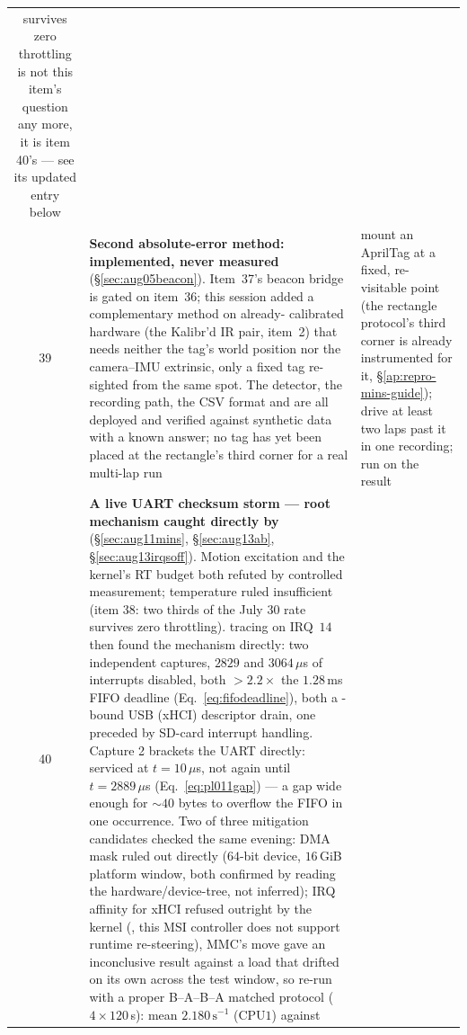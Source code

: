 \begin{longtable}{@{}cL{6.2cm}L{6.8cm}@{}}
    survives zero throttling is not this item's question any more, it is
    item 40's --- see its updated entry below \\
39 & \textbf{Second absolute-error method: implemented, never measured}
    (\S\ref{sec:aug05beacon}). Item~37's beacon bridge is gated on
    item~36; this session added a complementary method on already-
    calibrated hardware (the Kalibr'd IR pair, item~2) that needs
    neither the tag's world position nor the camera--IMU extrinsic, only
    a fixed tag re-sighted from the same spot. The detector, the
    recording path, the CSV format and  are
    all deployed and verified against synthetic data with a known
    answer; no tag has yet been placed at the rectangle's third corner
    for a real multi-lap run &
    mount an AprilTag at a fixed, re-visitable point (the rectangle
    protocol's third corner is already instrumented for it,
    \S\ref{ap:repro-mins-guide}); drive at least two laps past it in one
    recording; run  on the result \\
40 & \textbf{A live UART checksum storm --- root mechanism caught directly
    by } (\S\ref{sec:aug11mins}, \S\ref{sec:aug13ab},
    \S\ref{sec:aug13irqsoff}). Motion excitation and the kernel's RT budget
    both refuted by controlled measurement; temperature ruled insufficient
    (item 38: two thirds of the July 30 rate survives zero throttling).
     tracing on IRQ~$14$ then found the mechanism directly:
    two independent captures, $2829$ and $3064\,\mu$s of interrupts
    disabled, both $>\!2.2\times$ the $1.28$\,ms FIFO deadline
    (Eq.~\ref{eq:fifodeadline}), both a -bound USB (xHCI)
    descriptor drain, one preceded by SD-card interrupt handling. Capture 2
    brackets the UART directly: serviced at $t{=}10\,\mu$s, not again until
    $t{=}2889\,\mu$s (Eq.~\ref{eq:pl011gap}) --- a gap wide enough for
    $\sim\!40$ bytes to overflow the FIFO in one occurrence. Two of three
    mitigation candidates checked the same evening: DMA mask ruled out
    directly ($64$-bit device, $16$\,GiB platform window, both confirmed
    by reading the hardware/device-tree, not inferred); IRQ affinity for
    xHCI refused outright by the kernel (, this MSI
    controller does not support runtime re-steering), MMC's move gave an
    inconclusive result against a load that drifted on its own across the
    test window, so re-run with a proper B--A--B--A matched protocol
    ($4\times120$\,s): mean $2.180\,\mathrm{s}^{-1}$ (CPU$1$) against

\end{longtable}
